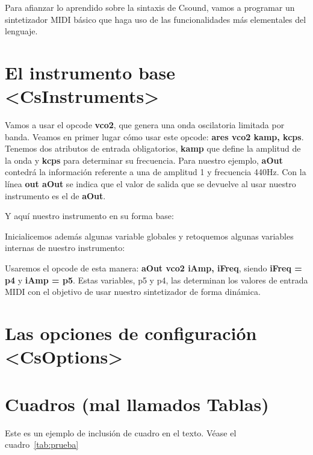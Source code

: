 Para afianzar lo aprendido sobre la sintaxis de Csound, vamos a programar un sintetizador MIDI básico que haga uso de las funcionalidades más elementales del lenguaje.

\section{El instrumento base \textless CsInstruments\textgreater}\label{sec:instSinte}

Vamos a usar el opcode \textbf{vco2}, que genera una onda oscilatoria limitada por banda. Veamos en primer lugar cómo usar este opcode: \textbf{ares vco2 kamp, kcps}. Tenemos dos atributos de entrada obligatorios, \textbf{kamp} que define la amplitud de la onda y \textbf{kcps} para determinar su frecuencia.
Para nuestro ejemplo, \textbf{aOut} contedrá la información referente a una de amplitud 1 y frecuencia 440Hz. Con la línea \textbf{out aOut} se indica que el valor de salida que se devuelve al usar nuestro instrumento es el de \textbf{aOut}.

Y aquí nuestro instrumento en su forma base:

Inicialicemos además algunas variable globales y retoquemos algunas variables internas de nuestro instrumento:


Usaremos el opcode de esta manera: \textbf{aOut vco2 iAmp, iFreq}, siendo \textbf{iFreq = p4} y \textbf{iAmp = p5}. Estas variables, p5 y p4, las determinan los valores de entrada MIDI con el objetivo de usar nuestro sintetizador de forma dinámica.

\section{Las opciones de configuración \textless CsOptions\textgreater}\label{sec:optSinte}

\section{Cuadros (mal llamados Tablas)}

Este es un ejemplo de inclusi\'on de cuadro en el texto. V\'ease el cuadro~\ref{tab:prueba}

